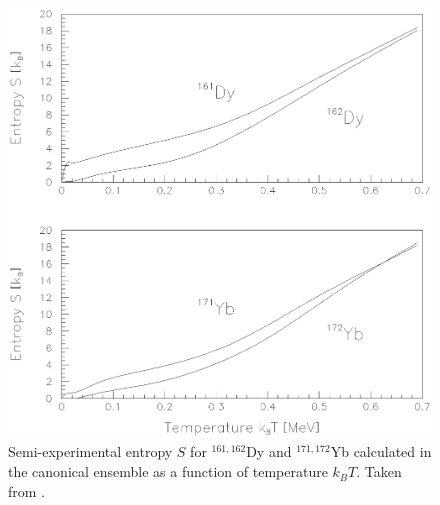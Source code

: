 \documentclass[rmp,aps,floatfix]{revtex4}
\begin{document}
\begin{figure}
\includegraphics[totalheight=12cm,angle=0,bb=0 80 350 730]{dean_hjorthjensen_fig28.ps}
\caption{Semi-experimental entropy 
$S$ for $^{161,162}$Dy and $^{171,172}$Yb calculated in 
the canonical ensemble as a 
function of temperature $k_BT$. Taken from \cite{entropy2000}.}
\label{fig:fig10_sec3}
\end{figure}
\end{document}
